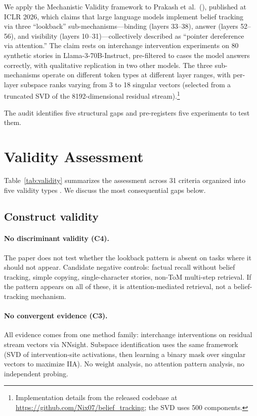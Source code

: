 \documentclass[11pt]{article}
\begin{document}
We apply the Mechanistic Validity framework \citep{tower2026mechval} to Prakash et al.\ (\citeyear{prakash2025lookback}), published at ICLR 2026, which claims that large language models implement belief tracking via three ``lookback'' sub-mechanisms---binding (layers 33--38), answer (layers 52--56), and visibility (layers 10--31)---collectively described as ``pointer dereference via attention.'' The claim rests on interchange intervention experiments on 80 synthetic stories in Llama-3-70B-Instruct, pre-filtered to cases the model answers correctly, with qualitative replication in two other models. The three sub-mechanisms operate on different token types at different layer ranges, with per-layer subspace ranks varying from 3 to 18 singular vectors (selected from a truncated SVD of the 8192-dimensional residual stream).\footnote{Implementation details from the released codebase at \url{https://github.com/Nix07/belief_tracking}; the SVD uses 500 components.}

The audit identifies five structural gaps and pre-registers five experiments to test them.


\section{Validity Assessment}
\label{sec:validity}

Table~\ref{tab:validity} summarizes the assessment across 31 criteria organized into five validity types \citep{tower2026mechval}. We discuss the most consequential gaps below.

\subsection{Construct validity}

\paragraph{No discriminant validity (C4).}
The paper does not test whether the lookback pattern is absent on tasks where it should not appear. Candidate negative controls: factual recall without belief tracking, simple copying, single-character stories, non-ToM multi-step retrieval. If the pattern appears on all of these, it is attention-mediated retrieval, not a belief-tracking mechanism.

\paragraph{No convergent evidence (C3).}
All evidence comes from one method family: interchange interventions on residual stream vectors via NNsight. Subspace identification uses the same framework (SVD of intervention-site activations, then learning a binary mask over singular vectors to maximize IIA). No weight analysis, no attention pattern analysis, no independent probing.
\end{document}

